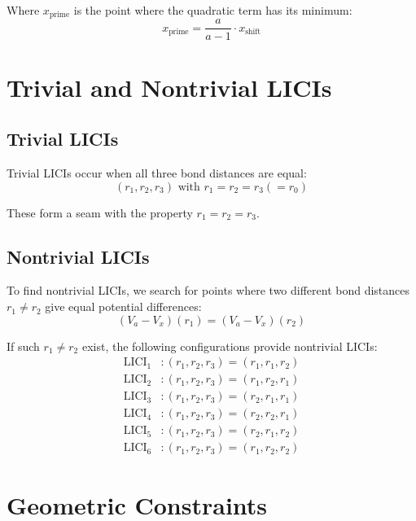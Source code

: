 \documentclass{article}
\begin{document}
Where $x_{\text{prime}}$ is the point where the quadratic term has its minimum:
\begin{equation}
x_{\text{prime}} = \frac{a}{a - 1} \cdot x_{\text{shift}}
\end{equation}

\section{Trivial and Nontrivial LICIs}

\subsection{Trivial LICIs}

Trivial LICIs occur when all three bond distances are equal:
\begin{equation}
(r_1, r_2, r_3) \text{ with } r_1 = r_2 = r_3 (= r_0)
\end{equation}

These form a seam with the property $r_1 = r_2 = r_3$.

\subsection{Nontrivial LICIs}

To find nontrivial LICIs, we search for points where two different bond distances $r_1 \neq r_2$ give equal potential differences:
\begin{equation}
(V_a - V_x)(r_1) = (V_a - V_x)(r_2)
\end{equation}

If such $r_1 \neq r_2$ exist, the following configurations provide nontrivial LICIs:
\begin{align}
\text{LICI}_1 &: (r_1, r_2, r_3) = (r_1, r_1, r_2) \\
\text{LICI}_2 &: (r_1, r_2, r_3) = (r_1, r_2, r_1) \\
\text{LICI}_3 &: (r_1, r_2, r_3) = (r_2, r_1, r_1) \\
\text{LICI}_4 &: (r_1, r_2, r_3) = (r_2, r_2, r_1) \\
\text{LICI}_5 &: (r_1, r_2, r_3) = (r_2, r_1, r_2) \\
\text{LICI}_6 &: (r_1, r_2, r_3) = (r_1, r_2, r_2)
\end{align}

\section{Geometric Constraints}
\end{document}
